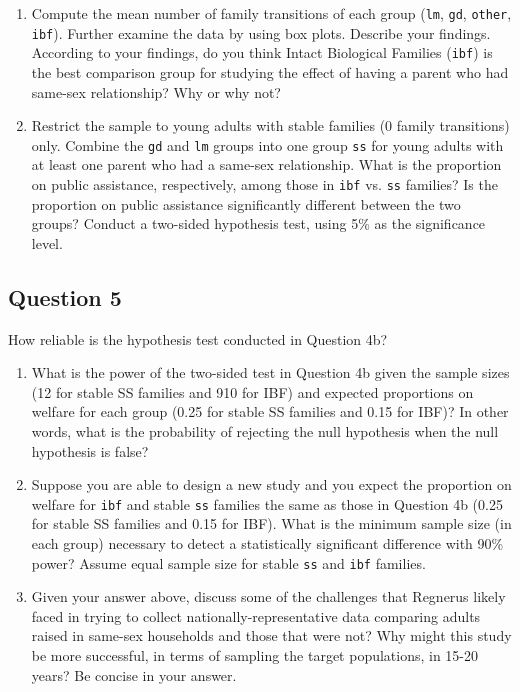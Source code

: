 \documentclass[]{article}
\begin{document}
\begin{enumerate}
\def\labelenumi{\alph{enumi}.}
\item
  Compute the mean number of family transitions of each group
  (\texttt{lm}, \texttt{gd}, \texttt{other}, \texttt{ibf}). Further
  examine the data by using box plots. Describe your findings. According
  to your findings, do you think Intact Biological Families
  (\texttt{ibf}) is the best comparison group for studying the effect of
  having a parent who had same-sex relationship? Why or why not?
\item
  Restrict the sample to young adults with stable families (0 family
  transitions) only. Combine the \texttt{gd} and \texttt{lm} groups into
  one group \texttt{ss} for young adults with at least one parent who
  had a same-sex relationship. What is the proportion on public
  assistance, respectively, among those in \texttt{ibf} vs. \texttt{ss}
  families? Is the proportion on public assistance significantly
  different between the two groups? Conduct a two-sided hypothesis test,
  using 5\% as the significance level.
\end{enumerate}

\subsection{Question 5}\label{question-5}

How reliable is the hypothesis test conducted in Question 4b?

\begin{enumerate}
\def\labelenumi{\alph{enumi}.}
\item
  What is the power of the two-sided test in Question 4b given the
  sample sizes (12 for stable SS families and 910 for IBF) and expected
  proportions on welfare for each group (0.25 for stable SS families and
  0.15 for IBF)? In other words, what is the probability of rejecting
  the null hypothesis when the null hypothesis is false?
\item
  Suppose you are able to design a new study and you expect the
  proportion on welfare for \texttt{ibf} and stable \texttt{ss} families
  the same as those in Question 4b (0.25 for stable SS families and 0.15
  for IBF). What is the minimum sample size (in each group) necessary to
  detect a statistically significant difference with 90\% power? Assume
  equal sample size for stable \texttt{ss} and \texttt{ibf} families.
\item
  Given your answer above, discuss some of the challenges that Regnerus
  likely faced in trying to collect nationally-representative data
  comparing adults raised in same-sex households and those that were
  not? Why might this study be more successful, in terms of sampling the
  target populations, in 15-20 years? Be concise in your answer.
\end{enumerate}
\end{document}

